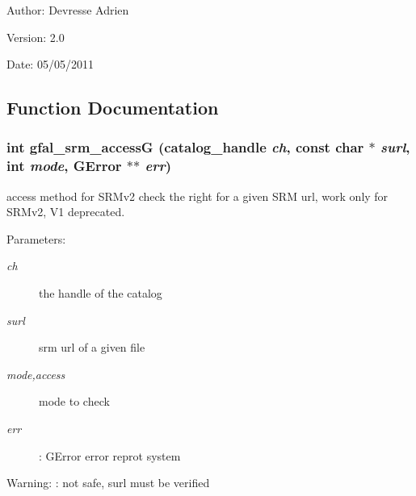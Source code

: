 \begin{Desc}
\item[Author:]Devresse Adrien \end{Desc}
\begin{Desc}
\item[Version:]2.0 \end{Desc}
\begin{Desc}
\item[Date:]05/05/2011 \end{Desc}


\subsection{Function Documentation}
\subsubsection{\setlength{\rightskip}{0pt plus 5cm}int gfal\_\-srm\_\-access\-G (catalog\_\-handle {\em ch}, const char $\ast$ {\em surl}, int {\em mode}, GError $\ast$$\ast$ {\em err})}\label{gfal__common__srm__access_8c_c97d6cdbdc19261f398fece514431491}


access method for SRMv2 check the right for a given SRM url, work only for SRMv2, V1 deprecated. 

\begin{Desc}
\item[Parameters:]
\begin{description}
\item[{\em ch}]the handle of the catalog \item[{\em surl}]srm url of a given file \item[{\em mode,access}]mode to check \item[{\em err}]: GError error reprot system \end{description}
\end{Desc}
\begin{Desc}
\item[Warning:]: not safe, surl must be verified \end{Desc}

